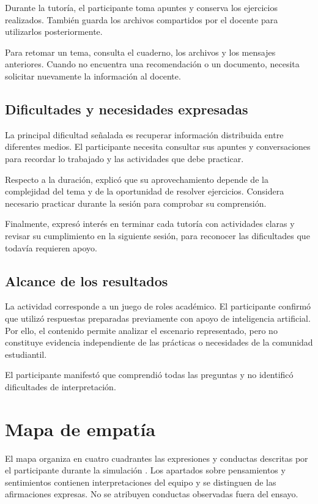 \documentclass[11pt,a4paper]{article}
\begin{document}
Durante la tutoría, el participante toma apuntes y conserva
los ejercicios realizados. También guarda los archivos
compartidos por el docente para utilizarlos posteriormente.

Para retomar un tema, consulta el cuaderno, los archivos
y los mensajes anteriores. Cuando no encuentra una
recomendación o un documento, necesita solicitar nuevamente
la información al docente.

\subsection{Dificultades y necesidades expresadas}

La principal dificultad señalada es recuperar información
distribuida entre diferentes medios. El participante necesita
consultar sus apuntes y conversaciones para recordar
lo trabajado y las actividades que debe practicar.

Respecto a la duración, explicó que su aprovechamiento
depende de la complejidad del tema y de la oportunidad
de resolver ejercicios. Considera necesario practicar
durante la sesión para comprobar su comprensión.

Finalmente, expresó interés en terminar cada tutoría
con actividades claras y revisar su cumplimiento en
la siguiente sesión, para reconocer las dificultades
que todavía requieren apoyo.

\subsection{Alcance de los resultados}

La actividad corresponde a un juego de roles académico.
El participante confirmó que utilizó respuestas preparadas
previamente con apoyo de inteligencia artificial. Por ello,
el contenido permite analizar el escenario representado,
pero no constituye evidencia independiente de las prácticas
o necesidades de la comunidad estudiantil.

El participante manifestó que comprendió todas las preguntas
y no identificó dificultades de interpretación.

\section{Mapa de empatía}

El mapa organiza en cuatro cuadrantes las expresiones y conductas descritas
por el participante durante la simulación \cite{pohl2025, ireb2026}. Los apartados
sobre pensamientos y sentimientos contienen interpretaciones
del equipo y se distinguen de las afirmaciones expresas.
No se atribuyen conductas observadas fuera del ensayo.
\end{document}
